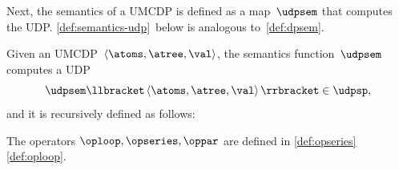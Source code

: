 Next, the semantics of a UMCDP is defined as a map~$\udpsem$ that
computes the UDP. \cref{def:semantics-udp}~below is analogous
to~\cref{def:dpsem}.
\begin{definition}
  \label{def:semantics-udp}Given an UMCDP~$\left\langle \atoms,\atree,\val\right\rangle $,
  the semantics function~$\udpsem$ computes a UDP
  \[
    \udpsem\llbracket\left\langle \atoms,\atree,\val\right\rangle \rrbracket\in\udpsp,
  \]
  and it is recursively defined as follows:

  \adjustbox{max width=8.6cm}{
    \noindent\begin{minipage}[t]{1\columnwidth}
               \[
                 \udpsem\llbracket\left\langle \atoms,a,\val\right\rangle \rrbracket=\val(a),\qquad\text{for all}\ a\in\atoms.
               \]
               \begin{align*}
                 \udpL\udpsem\llbracket\left\langle \atoms,\dpseries(\atree_{1},\atree_{2}),\val\right\rangle \rrbracket & =(\udpL\udpsem\llbracket\left\langle \atoms,\atree_{1},\val\right\rangle \rrbracket)\,\opseries\,(\udpL\udpsem\llbracket\left\langle \atoms,\atree_{2},\val\right\rangle \rrbracket),\\
                 \udpU\udpsem\llbracket\left\langle \atoms,\dpseries(\atree_{1},\atree_{2}),\val\right\rangle \rrbracket & =(\udpU\udpsem\llbracket\left\langle \atoms,\atree_{1},\val\right\rangle \rrbracket)\,\opseries\,(\udpU\udpsem\llbracket\left\langle \atoms,\atree_{2},\val\right\rangle \rrbracket),
               \end{align*}
               \begin{align*}
                 \udpL\udpsem\llbracket\left\langle \atoms,\dppar(\atree_{1},\atree_{2}),\val\right\rangle ] & =(\udpL\udpsem\llbracket\left\langle \atoms,\atree_{1},\val\right\rangle \rrbracket)\ \oppar\ (\udpL\udpsem\llbracket\left\langle \atoms,\atree_{2},\val\right\rangle \rrbracket),\\
                 \udpU\udpsem\llbracket\left\langle \atoms,\dppar(\atree_{1},\atree_{2}),\val\right\rangle ] & =(\udpU\udpsem\llbracket\left\langle \atoms,\atree_{1},\val\right\rangle \rrbracket)\ \oppar\ (\udpU\udpsem\llbracket\left\langle \atoms,\atree_{2},\val\right\rangle \rrbracket),
               \end{align*}
               \begin{align*}
                 \udpL\udpsem\llbracket\left\langle \atoms,\dploop(\atree),\val\right\rangle \rrbracket & =(\udpL\udpsem\llbracket\left\langle \atoms,\atree,\val\right\rangle \rrbracket)^{\oploop},\\
                 \udpU\udpsem\llbracket\left\langle \atoms,\dploop(\atree),\val\right\rangle \rrbracket & =(\udpU\udpsem\llbracket\left\langle \atoms,\atree,\val\right\rangle \rrbracket)^{\oploop}.
               \end{align*}

    \end{minipage}}
\end{definition}
The operators $\oploop,\opseries,\oppar$ are defined in \cref{def:opseries}\textendash \cref{def:oploop}.


